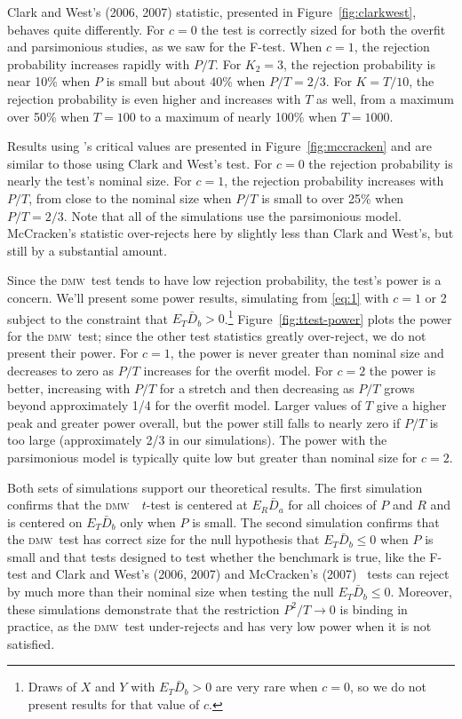 \documentclass[11pt]{article}
\newcommand{\citepos}[1]{\citeauthor{#1}'s \citeyearpar{#1}}
\newcommand{\oosA}{\bar{D}_a}
\newcommand{\oosB}{\bar{D}_b}
\newcommand{\dmw}{\textsc{dmw}}
\begin{document}
Clark and West's (2006, 2007) statistic, presented in
Figure~\ref{fig:clarkwest}, behaves quite differently.  For $c=0$ the
test is correctly sized for both the overfit and parsimonious studies,
as we saw for the F-test.  When $c=1$, the rejection probability
increases rapidly with $P/T$.  For $K_2=3$, the rejection probability
is near 10\% when $P$ is small but about 40\% when $P/T = 2/3$.  For
$K=T/10$, the rejection probability is even higher and increases with
$T$ as well, from a maximum over 50\% when $T=100$ to a maximum of
nearly 100\% when $T=1000$.

Results using \citepos{Mcc:07} critical values are
presented in Figure~\ref{fig:mccracken} and are similar to those using
Clark and West's test.  For $c=0$ the rejection probability is nearly
the test's nominal size.  For $c=1$, the rejection probability
increases with $P/T$, from close to the nominal size when $P/T$ is
small to over 25\% when $P/T = 2/3$.  Note that all of the simulations
use the parsimonious model.  McCracken's statistic over-rejects here
by slightly less than Clark and West's, but still by a substantial
amount.

Since the \dmw\ test tends to have low rejection probability, the
test's power is a concern.  We'll present some power results,
simulating from \eqref{eq:1} with $c = 1$ or 2 subject to the
constraint that $E_T \oosB > 0$.\footnote{Draws of $X$ and $Y$ with
  $E_T \oosB > 0$ are very rare when $c=0$, so we do not present
  results for that value of $c$.}  Figure~\ref{fig:ttest-power} plots
the power for the \dmw\ test; since the other test statistics greatly
over-reject, we do not present their power.  For $c=1$, the power is
never greater than nominal size and decreases to zero as $P/T$
increases for the overfit model.  For $c=2$ the power is better,
increasing with $P/T$ for a stretch and then decreasing as $P/T$ grows
beyond approximately 1/4 for the overfit model.  Larger values of $T$
give a higher peak and greater power overall, but the power still
falls to nearly zero if $P/T$ is too large (approximately 2/3 in our
simulations).  The power with the parsimonious model is typically
quite low but greater than nominal size for $c = 2$.

Both sets of simulations support our theoretical results.  The first
simulation confirms that the \dmw\ \oos\ $t$-test is centered at $E_R
\oosA$ for all choices of $P$ and $R$ and is centered on $E_T \oosB$
only when $P$ is small.  The second simulation confirms that the \dmw\
test has correct size for the null hypothesis that $E_T \oosB \leq 0$
when $P$ is small and that tests designed to test whether the
benchmark is true, like the F-test and Clark and West's (2006, 2007)
and McCracken's (2007) \oos\ tests can reject by much more than their
nominal size when testing the null $E_T \oosB \leq 0$.  Moreover,
these simulations demonstrate that the restriction $P^2/T \to 0$ is
binding in practice, as the \dmw\ test under-rejects and has very low
power when it is not satisfied.
\end{document}
